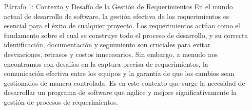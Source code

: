 Párrafo 1: Contexto y Desafío de la Gestión de Requerimientos
En el mundo actual de desarrollo de software, la gestión efectiva de los requerimientos es esencial para el éxito de cualquier proyecto. Los requerimientos actúan como el fundamento sobre el cual se construye todo el proceso de desarrollo, y su correcta identificación, documentación y seguimiento son cruciales para evitar desviaciones, retrasos y costos innecesarios. Sin embargo, a menudo nos encontramos con desafíos en la captura precisa de requerimientos, la comunicación efectiva entre los equipos y la garantía de que los cambios sean gestionados de manera controlada. Es en este contexto que surge la necesidad de desarrollar un programa de software que agilice y mejore significativamente la gestión de procesos de requerimientos.
